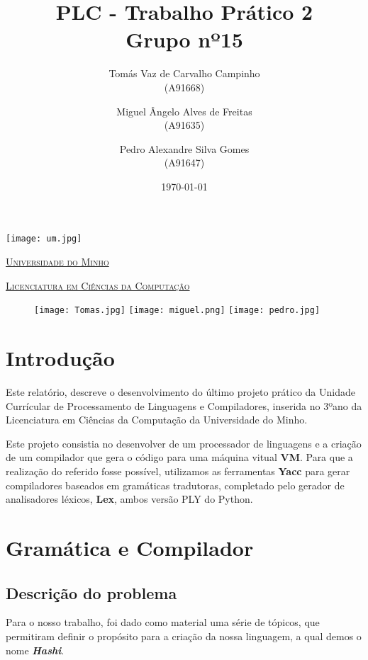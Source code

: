 \documentclass[11pt,a4paper]{report}
\title{PLC - Trabalho Prático 2\\
	\large Grupo nº15}
\author{Tomás Vaz de Carvalho Campinho \\ (A91668) \and Miguel Ângelo Alves de Freitas \\ (A91635)
         \and Pedro Alexandre Silva Gomes \\ (A91647)
       } %
\date{\today} %
\begin{document}
	\begin{minipage}{0.9\linewidth}
        \centering
		\texttt{[image: um.jpg]}\par\vspace{1cm}
		\href{https://www.uminho.pt/PT}
		{\scshape\LARGE Universidade do Minho} \par
		\vspace{0.6cm}
		\href{https://lcc.di.uminho.pt}
		{\scshape\Large Licenciatura em Ciências da Computação} \par
		\maketitle
		\begin{figure}[H]
			\texttt{[image: Tomas.jpg]}
			\texttt{[image: miguel.png]}
			\texttt{[image: pedro.jpg]}
		\end{figure}
	\end{minipage}
	
	\tableofcontents
	
	\pagebreak
	
	\chapter{Introdução}
%	
	Este relatório, descreve o desenvolvimento do último projeto prático da Unidade Currícular de Processamento de Linguagens e Compiladores, inserida no 3ºano da Licenciatura em Ciências da Computação da Universidade do Minho.
	
	Este projeto consistia no desenvolver de um processador de linguagens e a criação de um compilador que gera o código para uma máquina vitual \textbf{VM}. Para que a realização do referido fosse possível, utilizamos as ferramentas \textbf{Yacc} para gerar compiladores baseados em gramáticas tradutoras, completado pelo gerador de analisadores léxicos, \textbf{Lex}, ambos versão PLY do Python.  
	
	\pagebreak
	\chapter{Gramática e Compilador}
	\section{Descrição do problema}
	Para o nosso trabalho, foi dado como material uma série de tópicos, que permitiram definir o propósito para a criação da nossa linguagem, a qual demos o nome\textbf{\textit{ Hashi}}.
    
\end{document}
